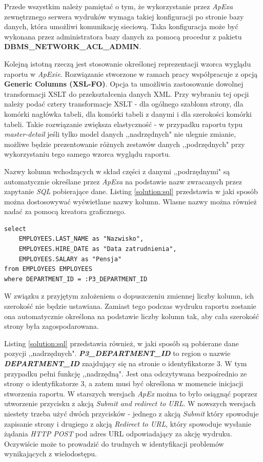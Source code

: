 \documentclass[11pt,a4paper]{article}
\begin{document}
Przede wszystkim należy pamiętać o tym, że wykorzystanie przez \emph{ApExa} zewnętrznego serwera wydruków wymaga takiej konfiguracji po stronie bazy danych, która umożliwi komunikację sieciową. Taka konfiguracja może być wykonana przez administratora bazy danych za pomocą procedur z pakietu \textbf{DBMS\_NETWORK\_ACL\_ADMIN}.

Kolejną istotną rzeczą jest stosowanie określonej reprezentacji wzorca wyglądu raportu w \emph{ApExie}. Rozwiązanie stworzone w ramach pracy współpracuje z opcją \textbf{Generic Columns (XSL-FO)}. Opcja ta umożliwia zastosowanie dowolnej transformacji XSLT do przekształcenia danych XML. Przy wybraniu tej opcji należy podać cztery transformacje XSLT - dla ogólnego szablonu strony, dla komórki nagłówka tabeli, dla komórki tabeli z danymi i dla szerokości komórki tabeli.
Takie rozwiązanie zwiększa elastyczność - w przypadku raportu typu \emph{master-detail} jeśli tylko model danych ,,nadrzędnych" nie ulegnie zmianie, możliwe będzie prezentowanie różnych zestawów danych ,,podrzędnych" przy wykorzystaniu tego samego wzorca wyglądu raportu. 

Nazwy kolumn wchodzących w skład części z danymi ,,podrzędnymi" są automatycznie określane przez \emph{ApExa} na podstawie nazw zwracanych przez zapytanie \emph{SQL} pobierające dane. Listing \ref{solution:sql} przedstawia w jaki sposób można dostosowywać wyświetlane nazwy kolumn. Wlasne nazwy można również nadać za pomocą kreatora graficznego.
 
\lstset{language=SQL}
\begin{lstlisting}[frame=single,caption=Przykładowe zapytanie \emph{SQL},label=solution:sql]
select
    EMPLOYEES.LAST_NAME as "Nazwisko",
    EMPLOYEES.HIRE_DATE as "Data zatrudnienia",
    EMPLOYEES.SALARY as "Pensja"
from EMPLOYEES EMPLOYEES
where DEPARTMENT_ID = :P3_DEPARTMENT_ID
\end{lstlisting}

W związku z przyjętym założeniem o dopuszczeniu zmiennej liczby kolumn, ich szerokość nie będzie ustawiana. Zamiast tego podczas wydruku raportu zostanie ona automatycznie określona na podstawie liczby kolumn tak, aby cała szerokość strony była zagospodarowana.

Listing \ref{solution:sql} przedstawia również, w jaki sposób są pobierane dane pozycji ,,nadrzędnych". \textbf{\emph{P3\_DEPARTMENT\_ID}} to region o nazwie \textbf{\emph{DEPARTMENT\_ID}} znajdujący się na stronie o identyfikatorze 3. W tym przypadku pełni funkcję ,,nadrzędną". Jest ona odczytywana bezpośrednio ze strony o identyfikatorze 3, a zatem musi być określona w momencie inicjacji stworzenia raportu. W starszych wersjach \emph{ApEx} można to było osiągnąć poprzez utworzenie przycisku z akcją \emph{Submit and redirect to URL}. W nowszych wersjach niestety trzeba użyć dwóch przycisków - jednego z akcją \emph{Submit} który spowoduje zapisanie strony i drugiego z akcją \emph{Redirect to URL}, który spowoduje wysłanie żądania \emph{HTTP POST} pod adres URL odpowiadający za akcję wydruku. Oczywiście może to prowadzić do trudnych w identyfikacji problemów wynikających z wielodostępu. 
\end{document}
